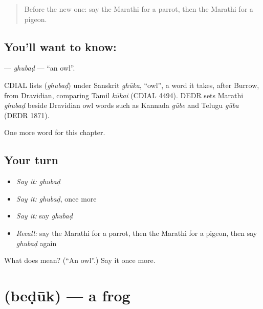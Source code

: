 \label{lesson:MR-C142-ghubad}



\begin{quote}
Before the new one: say the Marathi for a parrot, then the Marathi for a pigeon.
\end{quote}

\subsection*{You'll want to know: }
\textbf{} — \emph{ghubaḍ} — \textquotedblleft{}an owl\textquotedblright{}.

\begin{cousinweb}
CDIAL lists \textbf{} (\emph{ghubaḍ}) under Sanskrit \emph{ghūka}, \textquotedblleft{}owl\textquotedblright{}, a word it takes, after Burrow, from Dravidian, comparing Tamil \emph{kūkai} (CDIAL 4494). DEDR sets Marathi \emph{ghubaḍ} beside Dravidian owl words such as Kannada \emph{gūbe} and Telugu \emph{gūba} (DEDR 1871).
\end{cousinweb}

\begin{grammarlens}[title={What you've built}]
One more word for this chapter.
\end{grammarlens}

\subsection*{Your turn}
\begin{itemize}
\raggedright
  \item \emph{Say it:} \emph{ghubaḍ}
  \item \emph{Say it:} \emph{ghubaḍ}, once more
  \item \emph{Say it:} say \emph{ghubaḍ}
  \item \emph{Recall:} say the Marathi for a parrot, then the Marathi for a pigeon, then say \emph{ghubaḍ} again
\end{itemize}

\begin{tcolorbox}[breakable,colback=teal!4,colframe=teal!35!black,title={Before you move on}]
What does  mean? (\textquotedblleft{}An owl\textquotedblright{}.) Say it once more.
\end{tcolorbox}
\section[\texorpdfstring{\mr{बेडूक} (beḍūk)}{बेडूक (beḍūk)}]{ (beḍūk) — a frog}

